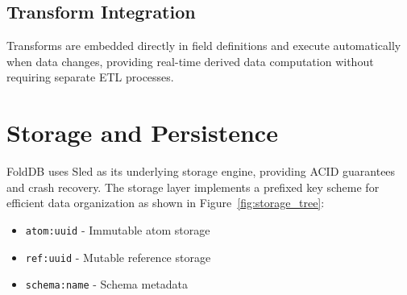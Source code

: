 \documentclass[11pt,a4paper]{article}
\begin{document}
\subsection{Transform Integration}

Transforms are embedded directly in field definitions and execute automatically when data changes, providing real-time derived data computation without requiring separate ETL processes.

\section{Storage and Persistence}

FoldDB uses Sled as its underlying storage engine, providing ACID guarantees and crash recovery. The storage layer implements a prefixed key scheme for efficient data organization as shown in Figure~\ref{fig:storage_tree}:

\begin{itemize}
\item \texttt{atom:uuid} - Immutable atom storage
\item \texttt{ref:uuid} - Mutable reference storage
\item \texttt{schema:name} - Schema metadata
\end{itemize}
\end{document}
